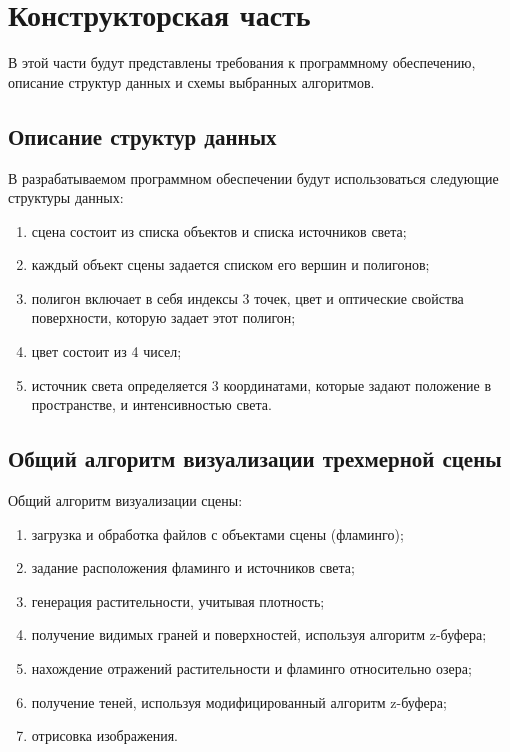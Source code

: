 \chapter{Конструкторская часть}

В этой части будут представлены требования к программному обеспечению, описание структур данных и схемы выбранных алгоритмов.

\section{Описание структур данных}

В разрабатываемом программном обеспечении будут использоваться следующие структуры данных:
\begin{enumerate}[label=\arabic*)]
	\item сцена состоит из списка объектов и списка источников света;
	\item каждый объект сцены задается списком его вершин и полигонов;
	\item полигон включает в себя индексы 3 точек, цвет и оптические свойства поверхности, которую задает этот полигон;
	\item цвет состоит из 4 чисел;
	\item источник света определяется 3 координатами, которые задают положение в пространстве, и интенсивностью света.
\end{enumerate}

\section{Общий алгоритм визуализации трехмерной сцены}

Общий алгоритм визуализации сцены:
\begin{enumerate}[label=\arabic*)]
	\item загрузка и обработка файлов с объектами сцены (фламинго);
	\item задание расположения фламинго и источников света;
	\item генерация растительности, учитывая плотность;
	\item получение видимых граней и поверхностей, используя алгоритм z-буфера;
	\item нахождение отражений растительности и фламинго относительно озера;
	\item получение теней, используя модифицированный алгоритм z-буфера;
	\item отрисовка изображения.
\end{enumerate}

